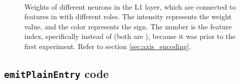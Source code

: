 \begin{figure}[h]
\qquad
{}
\qquad
{} \\

\caption{Weights of different neurons in the L1 layer, which are connected to features in  with different roles. The intensity represents the weight value, and the color represents the sign. The number is the feature index, specifically  instead of  (both are ), because it was prior to the first experiment. Refer to section \ref{sec:axis_encoding}.}
\end{figure}








\newpage
\subsection{\texttt{emitPlainEntry} code}
\label{appendix:emitPlainEntry}

